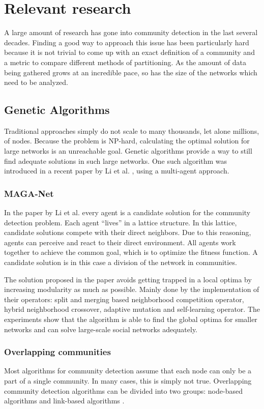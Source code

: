 \section{Relevant research}
\label{sec:relevantResearch}
A large amount of research has gone into community detection in the last several decades. 
Finding a good way to approach this issue has been particularly hard because it is not trivial to come up with an exact definition of a community and a metric to compare different methods of partitioning. 
As the amount of data being gathered grows at an incredible pace, so has the size of the networks which need to be analyzed. \\

\subsection*{Genetic Algorithms}
Traditional approaches simply do not scale to many thousands, let alone millions, of nodes. 
Because the problem is NP-hard, calculating the optimal solution for large networks is an unreachable goal.
Genetic algorithms provide a way to still find adequate solutions in such large networks. 
One such algorithm was introduced in a recent paper by Li et al. \cite{Li2016}, using a multi-agent approach. 

\subsubsection*{MAGA-Net}
In the paper by Li et al. \cite{Li2016} every agent is a candidate solution for the community detection problem.
Each agent ``lives'' in a lattice structure. 
In this lattice, candidate solutions compete with their direct neighbors.
Due to this reasoning, agents can perceive and react to their direct environment.
All agents work together to achieve the common goal, which is to optimize the fitness function.
A candidate solution is in this case a division of the network in communities.

The solution proposed in the paper avoids getting trapped in a local optima by increasing modularity as much as possible.
Mainly done by the implementation of their operators: split and merging based neighborhood competition operator, hybrid neighborhood crossover, adaptive mutation and self-learning operator.
The experiments show that the algorithm is able to find the global optima for smaller networks and can solve large-scale social networks adequately.

\subsubsection*{Overlapping communities}
Most algorithms for community detection assume that each node can only be a part of a single community. 
In many cases, this is simply not true. 
Overlapping community detection algorithms can be divided into two groups: node-based algorithms and link-based algorithms \cite{Shi2013}.\\

